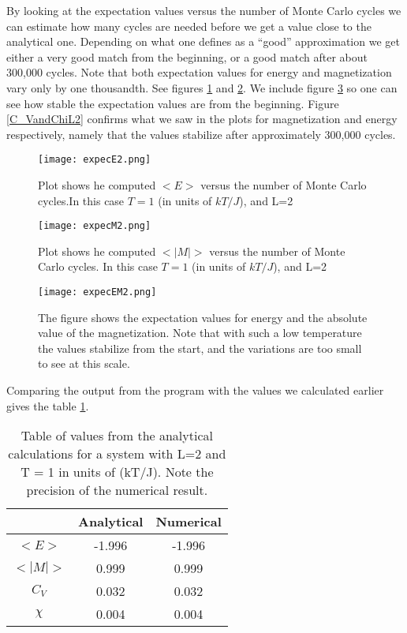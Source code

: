 \documentclass{aa}   %
\begin{document}
By looking at the expectation values versus the number of Monte Carlo cycles we can estimate how many cycles are needed before we get a value close to the analytical one. Depending on what one defines as a ``good'' approximation we get either a very good match from the beginning, or a good match after about 300,000 cycles. Note that both expectation values for energy and magnetization vary only by one thousandth. See figures \ref{expecE2} and \ref{expecM2}. We include figure \ref{expecEM2} so one can see how stable the expectation values are from the beginning. Figure \ref{C_VandChiL2} confirms what we saw in the plots for magnetization and energy respectively, namely that the values stabilize after approximately 300,000 cycles.

\begin{figure}
 \texttt{[image: expecE2.png]}
 \caption{Plot shows he computed $<E>$ versus the number of Monte Carlo cycles.In this case $T=1$ (in units of $kT/J$), and L=2}
\label{expecE2}
\end{figure}

\begin{figure}
 \texttt{[image: expecM2.png]}
 \caption{Plot shows he computed $<|M|>$ versus the number of Monte Carlo cycles. In this case $T=1$ (in units of $kT/J$), and L=2}
\label{expecM2}
\end{figure}

\begin{figure}
 \texttt{[image: expecEM2.png]}
 \caption{The figure shows the expectation values for energy and the absolute value of the magnetization. Note that with such a low temperature the values stabilize from the start, and the variations are too small to see at this scale.}
\label{expecEM2}
\end{figure}

Comparing the output from the program with the values we calculated earlier gives the table \ref{tab1}.
\begin{table}
 \begin{tabular}{|c|c|c|}
  \hline
  &Analytical &Numerical \\
  \hline
  $<E>$ &-1.996 & -1.996\\
  \hline
  $<|M|>$& 0.999& 0.999\\
  \hline
  $C_V$ & 0.032& 0.032\\
  \hline
  $\chi$ & 0.004& 0.004\\
  \hline
 \end{tabular}
\caption{Table of values from the analytical calculations for a system with L=2 and T = 1 in units of (kT/J). Note the precision of the numerical result.}
\label{tab1}
\end{table}
\end{document}
